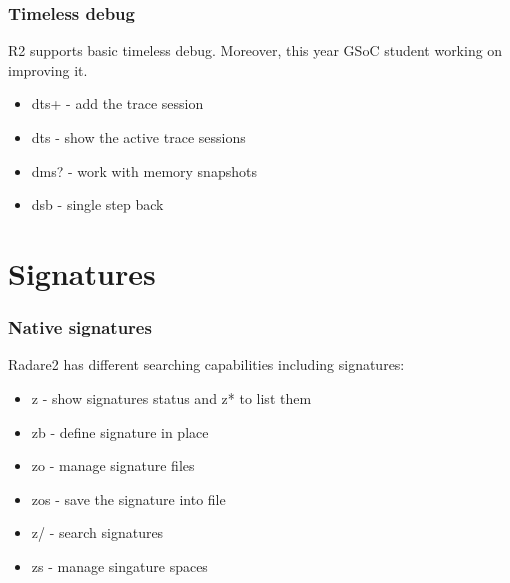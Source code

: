 \documentclass[10pt,pdf,utf8,english,compress,hyperref={unicode}]{beamer}
\begin{document}

\begin{frame}[fragile]
  \frametitle{Timeless debug}
  R2 supports basic timeless debug. Moreover, this year GSoC student working on improving it.
  \begin{itemize}
	  \item \alert{dts+} - add the trace session
	  \item \alert{dts} - show the active trace sessions
	  \item \alert{dms?} - work with memory snapshots
	  \item \alert{dsb} - single step back
  \end{itemize}
\end{frame}

\section{Signatures}

\begin{frame}[fragile]
  \frametitle{Native signatures}
  Radare2 has different searching capabilities including signatures:
  \begin{itemize}
	  \item \alert{z} - show signatures status and \alert{z*} to list them
	  \item \alert{zb} - define signature in place
	  \item \alert{zo} - manage signature files
	  \item \alert{zos} - save the signature into file
	  \item \alert{z/} - search signatures
	  \item \alert{zs} - manage singature spaces
  \end{itemize}
\end{frame}
\end{document}
